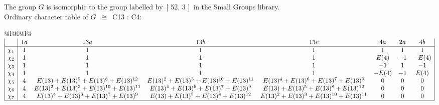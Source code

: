 \documentclass[varwidth=\maxdimen,border=10]{standalone}
\begin{document}
The group $G$ is isomorphic to the group labelled by\ [ 52, 3 ]\ in the Small Groups library.\\
Ordinary character table of $G$\ $\cong$\ C13 : C4:\\
\begin{center}
\begin{tabular}{@{}l@{}l@{}l@{}}
\hline
\(\begin{array}{|l|ccccccc|}
  & 1a & 13a & 13b & 13c & 4a & 2a & 4b\\ \hline
\chi_{1} & 1 & 1 & 1 & 1 & 1 & 1 & 1\\
\chi_{2} & 1 & 1 & 1 & 1 & E(4) & -1 & -E(4)\\
\chi_{3} & 1 & 1 & 1 & 1 & -1 & 1 & -1\\
\chi_{4} & 1 & 1 & 1 & 1 & -E(4) & -1 & E(4)\\
\chi_{5} & 4 & E(13)+E(13)^{5}+E(13)^{8}+E(13)^{12} & E(13)^{2}+E(13)^{3}+E(13)^{10}+E(13)^{11} & E(13)^{4}+E(13)^{6}+E(13)^{7}+E(13)^{9} & 0 & 0 & 0\\
\chi_{6} & 4 & E(13)^{2}+E(13)^{3}+E(13)^{10}+E(13)^{11} & E(13)^{4}+E(13)^{6}+E(13)^{7}+E(13)^{9} & E(13)+E(13)^{5}+E(13)^{8}+E(13)^{12} & 0 & 0 & 0\\
\chi_{7} & 4 & E(13)^{4}+E(13)^{6}+E(13)^{7}+E(13)^{9} & E(13)+E(13)^{5}+E(13)^{8}+E(13)^{12} & E(13)^{2}+E(13)^{3}+E(13)^{10}+E(13)^{11} & 0 & 0 & 0\\
\hline
\end{array}\)\\
\end{tabular}
\end{center}
\end{document}
